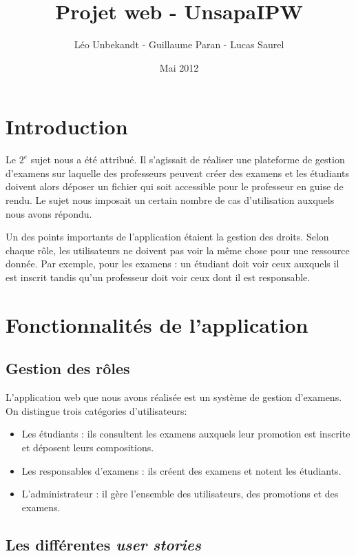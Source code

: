 \documentclass{report}
\author{Léo Unbekandt - Guillaume Paran - Lucas Saurel}
\date{Mai 2012}
\title{Projet web - UnsapaIPW}
\begin{document}
  \maketitle
  \clearpage
  \tableofcontents
  \clearpage

  \section*{Introduction}
    Le $2^e$ sujet nous a été attribué. Il s'agissait de réaliser une plateforme
    de gestion d'examens sur laquelle des professeurs peuvent créer des examens
    et les étudiants doivent alors déposer un fichier qui soit accessible pour
    le professeur en guise de rendu. Le sujet nous imposait un certain nombre de
    cas d'utilisation auxquels nous avons répondu.

    Un des points importants de l'application étaient la gestion des droits.
    Selon chaque rôle, les utilisateurs ne doivent pas voir la même chose
    pour une ressource donnée. Par exemple, pour les examens : un étudiant doit voir
    ceux auxquels il est inscrit tandis qu'un professeur doit voir ceux dont il est 
    responsable.

  \clearpage
    
  \section{Fonctionnalités de l'application}
    \subsection{Gestion des rôles}
      L'application web que nous avons réalisée est un système de gestion 
      d'examens. On distingue trois catégories d'utilisateurs:

      \begin{itemize}
        \item{Les étudiants : ils consultent les examens auxquels leur promotion 
          est inscrite et déposent leurs compositions.}
        \item{Les responsables d'examens : ils créent des examens et notent les 
          étudiants.}
        \item{L'administrateur : il gère l'ensemble des utilisateurs, des 
          promotions et des examens.}
      \end{itemize}

    \subsection{Les différentes \textsl{user stories}}
\end{document}
